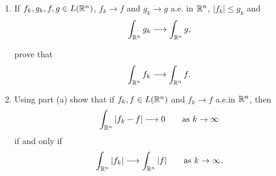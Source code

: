 \begin{problem}
\begin{enumerate}[label=(\alph*)]
\item If \(f_k,g_k,f,g\in L(\mathbb{R}^n)\), \(f_k\to f\) and \(g_k\to g\) a.e.\@
  in \(\mathbb{R}^n\), \(|f_k|\leq g_k\) and
  \[
    \int_{\mathbb{R}^n}g_k\longrightarrow\int_{\mathbb{R}^n}g,
  \]

  prove that
  \[
    \int_{\mathbb{R}^n} f_k\longrightarrow\int_{\mathbb{R}^n}f.
  \]
\item Using part (a) show that if \(f_k,f\in L(\mathbb{R}^n)\) and \(f_k\to f\)
  a.e.\@ in \(\mathbb{R}^n\), then
  \[
    \int_{\mathbb{R}^n}|f_k-f|\longrightarrow 0\qquad\text{as \(k\to\infty\)}
  \]
  if and only if
  \[
    \int_{\mathbb{R}^n}|f_k|\longrightarrow\int_{\mathbb{R}^n}|f|\qquad\text{as
      \(k\to\infty\)}.
  \]
\end{enumerate}
\end{problem}
\begin{solution}
\end{solution}

